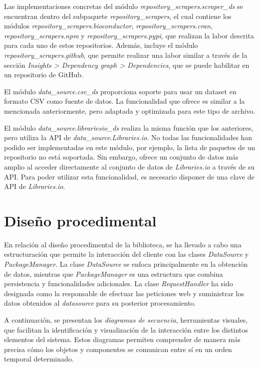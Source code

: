 Las implementaciones concretas del módulo \textit{repository\_scrapers}.\textit{scraper\_ds} se encuentran
dentro del subpaquete \textit{repository\_scrapers}, el cual contiene los módulos \textit{repository\_scrapers}.\textit{bioconductor},
\textit{repository\_scrapers}.\textit{cran}, \textit{repository\_scrapers}.\textit{npm}
y \textit{repository\_scrapers}.\textit{pypi}, que realizan la labor descrita para cada uno de
estos repositorios. Además, incluye el módulo \textit{repository\_scrapers}.\textit{github}, que permite
realizar una labor similar a través de la sección \textit{Insights > Dependency graph > Dependencies}, que se puede
habilitar en un repositorio de GitHub.

El módulo \textit{data\_source}.\textit{csv\_ds} proporciona soporte para usar un dataset en formato CSV como fuente de
datos. La funcionalidad que ofrece es similar a la mencionada anteriormente, pero adaptada y optimizada
para este tipo de archivo.

El módulo \textit{data\_source}.\textit{librariesio\_ds} realiza la misma función que los anteriores, pero utiliza la
API de \textit{data\_source}.\textit{Libraries.io}. No todas las funcionalidades han podido ser implementadas en este
módulo, por ejemplo, la lista de paquetes de un repositorio no está soportada. Sin embargo, ofrece
un conjunto de datos más amplio al acceder directamente al conjunto de datos de \textit{Libraries.io}
a través de su API. Para poder utilizar esta funcionalidad, es necesario disponer de una clave de API
de \textit{Libraries.io}.


\section{Diseño procedimental}

En relación al diseño procedimental de la biblioteca, se ha llevado a cabo una estructuración que permite la interacción
del cliente con las clases \textit{DataSource} y \textit{PackageManager}. La clase \textit{DataSource} se enfoca
principalmente en la obtención de datos, mientras que \textit{PackageManager} es una estructura que combina
persistencia y funcionalidades adicionales. La clase \textit{RequestHandler} ha sido designada como la responsable
de efectuar las peticiones web y suministrar los datos obtenidos al \textit{datasource} para su posterior
procesamiento.

A continuación, se presentan los \textit{diagramas de secuencia}, herramientas visuales, que
facilitan la identificación y visualización de la interacción entre los distintos elementos del sistema. Estos
diagramas permiten comprender de manera más precisa cómo los objetos y componentes se comunican entre sí en un
orden temporal determinado.

